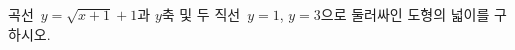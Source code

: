 \hspace*{2mm}\begin{minipage}[t]{\dimexpr\linewidth-2mm\relax}\vspace{0pt}
곡선~$y=\sqrt{x+1}+1$과 $y$축 및 두 직선~$y=1$, $y=3$으로 둘러싸인 도형의 넓이를 구하시오.\end{minipage}
